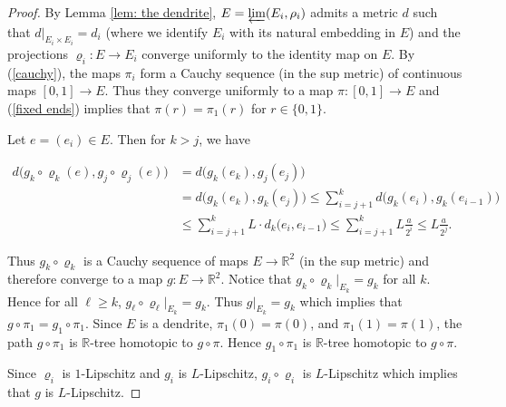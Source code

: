 \documentclass[10pt,a4paper]{amsart}
\begin{document}
\begin{proof}
    By Lemma \ref{lem: the dendrite}, $E = \varprojlim(E_i, \rho_i)$ admits a metric $d$ such that  $d|_{E_i\times E_i}= d_i$ (where we identify $E_i$ with its natural embedding in $E$) and the projections $\varrho_i: E\to E_i$ converge uniformly to the identity map on $E$. By (\ref{cauchy}), the maps $\pi_i$ form a Cauchy sequence (in the sup metric) of continuous maps $[0,1]\to E$.  Thus they converge uniformly to a map $\pi:[0,1]\to E$ and (\ref{fixed ends}) implies that $\pi(r)= \pi_1(r)$ for $r\in \{0,1\}$.

    Let $e= (e_i)\in E$.  Then for $k>j$, we have

    \begin{align*}
        d\big(g_k\circ\varrho_k(e), g_j\circ\varrho_j(e)\big) &=d\big(g_k(e_k), g_j(e_j)\big)\\
                    &=d\big(g_k(e_k), g_k(e_j)\big)\leq  \sum\limits_{i=j+1}^{k}d\big(g_k(e_i), g_k(e_{i-1})\big)\\
                    &\leq\sum\limits_{i=j+1}^{k}L\cdot d_k\big(e_i, e_{i-1})\leq\sum\limits_{i=j+1}^{k}L\frac{a}{2^i} \leq L\frac{a}{2^j}.
    \end{align*}


    Thus $g_k\circ\varrho_k$ is a Cauchy sequence of maps $E\to \mathbb{R}^2$ (in the sup metric) and therefore converge to a map $g: E\to \mathbb{R}^2$.  Notice that $g_k\circ\varrho_k|_{E_k} = g_k$ for all $k$.  Hence for all $\ell\geq k$, $g_\ell\circ\varrho_\ell|_{E_k} = g_k$.  Thus $g|_{E_k} = g_k$ which implies that $g\circ \pi_1 = g_1\circ \pi_1$.  Since $E$ is a dendrite, $\pi_1(0)= \pi(0)$, and $\pi_1(1) = \pi(1)$, the path $g\circ \pi_1$ is $\mathbb R$-tree homotopic to $g\circ \pi$. Hence $g_1\circ \pi_1$ is $\mathbb R$-tree homotopic to $g\circ \pi$.


    Since $\varrho_i$ is $1$-Lipschitz and $g_i$ is $L$-Lipschitz, $g_i\circ \varrho_i$ is $L$-Lipschitz which implies that $g$ is $L$-Lipschitz.

\end{proof}
\end{document}

